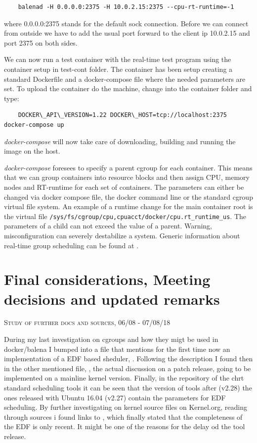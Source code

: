\documentclass[]{scrartcl}
\begin{document}
\begin{verbatim}
	balenad -H 0.0.0.0:2375 -H 10.0.2.15:2375 --cpu-rt-runtime=-1
\end{verbatim}

where 0.0.0.0:2375 stands for the default sock connection. Before we can connect from outside we have to add the usual port forward to the client ip 10.0.2.15 and port 2375 on both sides.

We can now run a test container with the real-time test program using the container setup in test-cont folder. The container has been setup creating a standard Dockerfile and a docker-compose file where the needed parameters are set. To upload the container do the machine, change into the container folder and type:

\begin{verbatim}
	DOCKER\_API\_VERSION=1.22 DOCKER\_HOST=tcp://localhost:2375 docker-compose up
\end{verbatim}

\textit{docker-compose} will now take care of downloading, building and running the image on the host.

\textit{docker-compose} foresees to specify a parent cgroup for each container. This means that we can group containers into resource blocks and then assign CPU, memory nodes and RT-runtime for each set of containers. The parameters can either be changed via docker compose file, the docker command line or the standard cgroup virtual file system. An example of a runtime change for the main container root is the virtual file \texttt{/sys/fs/cgroup/cpu,cpuacct/docker/cpu.rt\_runtime\_us}. The parameters of a child can not exceed the value of a parent. Warning, misconfiguration can severely destabilize a system. Generic information about real-time group scheduling can be found at \cite{kernel01}.

\section{Final considerations, Meeting decisions and updated remarks}

{\small\textsc{Study of further docs and sources, 06/08 - 07/08/18} \bigskip}

During my last investigation on cgroups and how they migt be used in docker/balena I bumped into a file that mentions for the first time now an implementation of a EDF based sheduler, 
\cite{kernel01}.
Following the description I found then in the other mentioned file,
\cite{kernel02}, the actual discussion on a patch release, going to be implemented on a mainline kernel version.
Finally, in the repository of the chrt standard scheduling tools \cite{schtools01} it can be seen that the version of tools after (v2.28) the ones released with Ubuntu 16.04 (v2.27) contain the parameters for EDF scheduling.
By further investigating on kernel source files on Kernel.org, reading through sources i found links to
\cite{wiki01}, which finally stated that the completeness of the EDF is only recent. It might be one of the reasons for the delay od the tool release.
\bigskip
\end{document}
